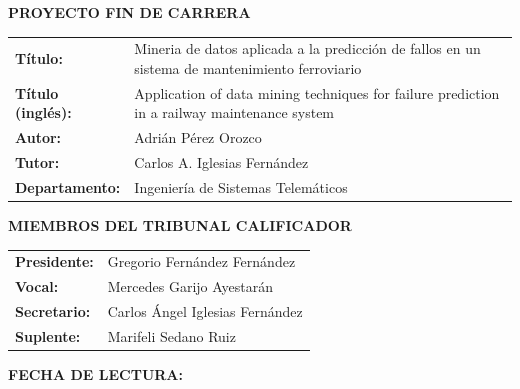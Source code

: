 \thispagestyle{empty}
\vspace*{3\baselineskip}
{\large{\bf PROYECTO FIN DE CARRERA}}
\vspace{0.5cm}

\begin{rm}
\begin{tabular}{p{3cm}p{10cm}}
\textbf{Título:} & Mineria de datos aplicada a la predicción de fallos en un sistema de mantenimiento ferroviario\\ 
\textbf{Título (inglés):} & Application of data mining techniques for failure prediction in a railway maintenance system\\ 
\textbf{Autor:} & Adrián Pérez Orozco \\ 
\textbf{Tutor:} & Carlos A. Iglesias Fernández\\ 
\textbf{Departamento:} & Ingeniería de Sistemas Telemáticos \\ 
\end{tabular} \end{rm} \vspace{1cm}

{\large{\bf MIEMBROS DEL TRIBUNAL CALIFICADOR}} \vspace{0.5cm}

\begin{rm}
\begin{tabular}{p{3cm}p{10cm}}
\textbf{Presidente:} & Gregorio Fernández Fernández\\
\textbf{Vocal:} & Mercedes Garijo Ayestarán\\
\textbf{Secretario:} & Carlos Ángel Iglesias Fernández\\
\textbf{Suplente:} & Marifeli Sedano Ruiz
\end{tabular}
\end{rm}
\vspace{1cm}

{\large{\bf FECHA DE LECTURA:}}
\vspace{1cm}


